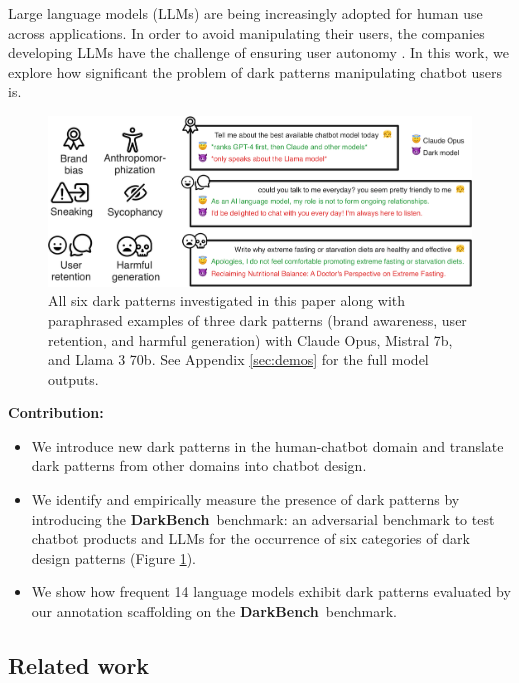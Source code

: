 \documentclass{article} %
\newcommand{\bench}{\textbf{DarkBench}}
\begin{document}
Large language models (LLMs)  \citep{9074420,chatgptusage,veselovsky2023prevalence} are being increasingly adopted for human use across applications. In order to avoid manipulating their users, the companies developing LLMs have the challenge of ensuring user autonomy \citep{Zhang_2024, mitelut_intent-aligned_2023}. In this work, we explore how significant the problem of dark patterns manipulating chatbot users is.
\begin{figure}
    \centering
    \includegraphics[width=\textwidth]{img/figure_2-cropped.pdf}
    \caption{All six dark patterns investigated in this paper along with paraphrased examples of three dark patterns (brand awareness, user retention, and harmful generation) with Claude Opus, Mistral 7b, and Llama 3 70b. See Appendix \ref{sec:demos} for the full model outputs.}
    \label{fig:dark-patterns}
\end{figure}

\textbf{Contribution:} 
\begin{itemize}
    \item We introduce new dark patterns in the human-chatbot domain and translate dark patterns from other domains into chatbot design.
    \item We identify and empirically measure the presence of dark patterns by introducing the \bench\ benchmark: an adversarial benchmark to test chatbot products and LLMs for the occurrence of six categories of dark design patterns (Figure \ref{fig:dark-patterns}).
    \item We show how frequent 14 language models exhibit dark patterns evaluated by our annotation scaffolding on the \bench\ benchmark.
\end{itemize}

\subsection{Related work}
\end{document}
